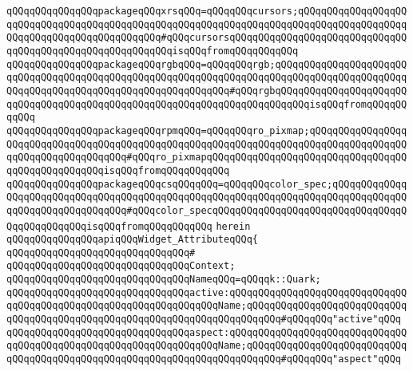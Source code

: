 \verb|qQQqqQQqqQQqqQQqpackageqQQqxrsqQQq=qQQqqQQqcursors;qQQqqQQqqQQqqQQqqQQqqQQqqQQqqQQqqQQqqQQqqQQqqQQqqQQqqQQqqQQqqQQqqQQqqQQqqQQqqQQqqQQqqQQqqQQqqQQqqQQqqQQqqQQqqQQqqQQq#qQQqcursorsqQQqqQQqqQQqqQQqqQQqqQQqqQQqqQQqqQQqqQQqqQQqqQQqqQQqqQQqqQQqisqQQqfromqQQqqQQqqQQq|\newline
\verb|qQQqqQQqqQQqqQQqpackageqQQqrgbqQQq=qQQqqQQqrgb;qQQqqQQqqQQqqQQqqQQqqQQqqQQqqQQqqQQqqQQqqQQqqQQqqQQqqQQqqQQqqQQqqQQqqQQqqQQqqQQqqQQqqQQqqQQqqQQqqQQqqQQqqQQqqQQqqQQqqQQqqQQqqQQqqQQq#qQQqrgbqQQqqQQqqQQqqQQqqQQqqQQqqQQqqQQqqQQqqQQqqQQqqQQqqQQqqQQqqQQqqQQqqQQqqQQqqQQqisqQQqfromqQQqqQQqqQQq|\newline
\verb|qQQqqQQqqQQqqQQqpackageqQQqrpmqQQq=qQQqqQQqro_pixmap;qQQqqQQqqQQqqQQqqQQqqQQqqQQqqQQqqQQqqQQqqQQqqQQqqQQqqQQqqQQqqQQqqQQqqQQqqQQqqQQqqQQqqQQqqQQqqQQqqQQqqQQqqQQq#qQQqro_pixmapqQQqqQQqqQQqqQQqqQQqqQQqqQQqqQQqqQQqqQQqqQQqqQQqqQQqisqQQqfromqQQqqQQqqQQq|\newline
\verb|qQQqqQQqqQQqqQQqpackageqQQqcsqQQqqQQq=qQQqqQQqcolor_spec;qQQqqQQqqQQqqQQqqQQqqQQqqQQqqQQqqQQqqQQqqQQqqQQqqQQqqQQqqQQqqQQqqQQqqQQqqQQqqQQqqQQqqQQqqQQqqQQqqQQqqQQq#qQQqcolor_specqQQqqQQqqQQqqQQqqQQqqQQqqQQqqQQqqQQqqQQqqQQqqQQqisqQQqfromqQQqqQQqqQQq|\newline
\verb|herein|\newline
\newline
\verb|qQQqqQQqqQQqqQQqapiqQQqWidget_AttributeqQQq{|\newline
\verb|qQQqqQQqqQQqqQQqqQQqqQQqqQQqqQQq#|\newline
\verb|qQQqqQQqqQQqqQQqqQQqqQQqqQQqqQQqContext;|\newline
\newline
\verb|qQQqqQQqqQQqqQQqqQQqqQQqqQQqqQQqNameqQQq=qQQqqk::Quark;|\newline
\newline
\verb|qQQqqQQqqQQqqQQqqQQqqQQqqQQqqQQqactive:qQQqqQQqqQQqqQQqqQQqqQQqqQQqqQQqqQQqqQQqqQQqqQQqqQQqqQQqqQQqqQQqqQQqName;qQQqqQQqqQQqqQQqqQQqqQQqqQQqqQQqqQQqqQQqqQQqqQQqqQQqqQQqqQQqqQQqqQQqqQQqqQQq#qQQqqQQq"active"qQQq|\newline
\verb|qQQqqQQqqQQqqQQqqQQqqQQqqQQqqQQqaspect:qQQqqQQqqQQqqQQqqQQqqQQqqQQqqQQqqQQqqQQqqQQqqQQqqQQqqQQqqQQqqQQqqQQqName;qQQqqQQqqQQqqQQqqQQqqQQqqQQqqQQqqQQqqQQqqQQqqQQqqQQqqQQqqQQqqQQqqQQqqQQqqQQq#qQQqqQQq"aspect"qQQq|\newline
